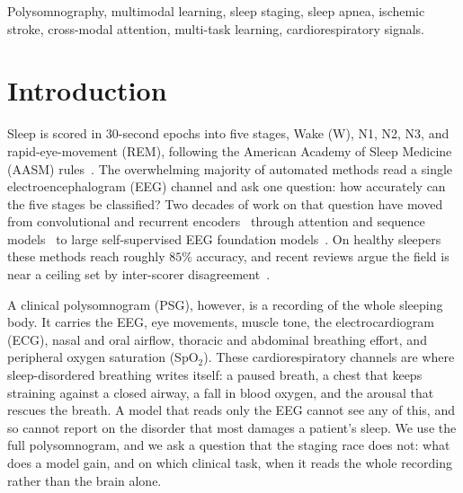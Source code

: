 \documentclass[preprint,12pt]{elsarticle}
\providecommand{\IEEEPARstart}[2]{#1#2}
\begin{document}
\begin{frontmatter}
\begin{keyword}
Polysomnography, multimodal learning, sleep staging, sleep apnea, ischemic stroke,
cross-modal attention, multi-task learning, cardiorespiratory signals.
\end{keyword}

\end{frontmatter}

\section{Introduction}
\IEEEPARstart{S}{leep} is scored in 30-second epochs into five stages, Wake (W), N1, N2,
N3, and rapid-eye-movement (REM), following the American Academy of Sleep Medicine (AASM)
rules~\cite{aasm2023manual}. The overwhelming majority of automated methods read a single
electroencephalogram (EEG) channel and ask one question: how accurately can the five stages
be classified? Two decades of work on that question have moved from convolutional and
recurrent encoders~\cite{supratak2017deepsleepnet,phan2019seqsleepnet,supratak2020tinysleepnet}
through attention and sequence models~\cite{eldele2021attnsleep,phan2021xsleepnet,
perslev2019utime} to large self-supervised EEG foundation
models~\cite{labram2024,cbramod2025,eegpt2024,biot2023}. On healthy sleepers these methods
reach roughly $85\%$ accuracy, and recent reviews argue the field is near a ceiling set by
inter-scorer disagreement~\cite{phan2022survey}.

A clinical polysomnogram (PSG), however, is a recording of the whole sleeping body. It
carries the EEG, eye movements, muscle tone, the electrocardiogram (ECG), nasal and oral
airflow, thoracic and abdominal breathing effort, and peripheral oxygen saturation
(SpO$_2$). These cardiorespiratory channels are where sleep-disordered breathing writes
itself: a paused breath, a chest that keeps straining against a closed airway, a fall in
blood oxygen, and the arousal that rescues the breath. A model that reads only the EEG
cannot see any of this, and so cannot report on the disorder that most damages a patient's
sleep. We use the full polysomnogram, and we ask a question that the staging race does not:
what does a model gain, and on which clinical task, when it reads the whole recording rather
than the brain alone.
\end{document}
